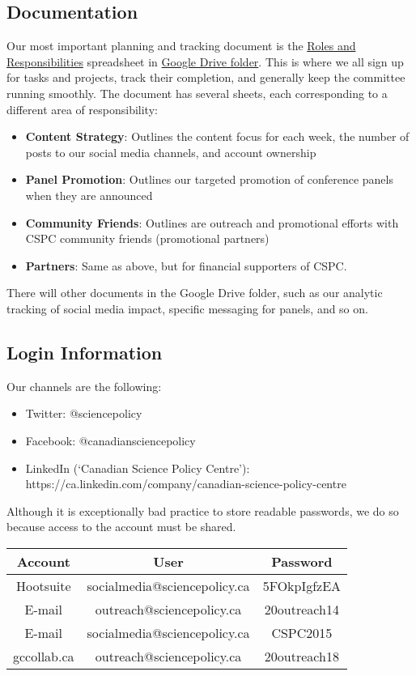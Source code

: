 \documentclass[11pt]{amsart}
\begin{document}
\subsection{Documentation}
Our most important planning and tracking document is the \href{https://docs.google.com/spreadsheets/d/1lpFBDv1iNDUWX_q2PlV3-wX9bY-DUmBBHCQLArtSenY/edit?usp=sharing}{Roles and Responsibilities} spreadsheet in \href{https://drive.google.com/drive/folders/1JjcAsWjjbja4auyTV0g8y4WW9DR7mqMj}{Google Drive folder}.
This is where we all sign up for tasks and projects, track their completion, and generally keep the committee running smoothly.
The document has several sheets, each corresponding to a different area of responsibility:
\begin{itemize}
\item \textbf{Content Strategy}: Outlines the content focus for each week, the number of posts to our social media channels, and account ownership
\item \textbf{Panel Promotion}: Outlines our targeted promotion of conference panels when they are announced
\item \textbf{Community Friends}: Outlines are outreach and promotional efforts with CSPC community friends (promotional partners)
\item \textbf{Partners}: Same as above, but for financial supporters of CSPC.
\end{itemize}
There will other documents in the Google Drive folder, such as our analytic tracking of social media impact, specific messaging for panels, and so on.
\subsection{Login Information}
Our channels are the following:
\begin{itemize}
\item Twitter: @sciencepolicy
\item Facebook: @canadiansciencepolicy
\item LinkedIn (`Canadian Science Policy Centre'): https://ca.linkedin.com/company/canadian-science-policy-centre
\end{itemize}
Although it is exceptionally bad practice to store readable passwords, we do so because access to the account must be shared.
\begin{table}
\centering
\begin{tabular}{|c|c|c|}\hline
Account & User & Password \\\hline
Hootsuite	 & socialmedia@sciencepolicy.ca & 5FOkpIgfzEA \\\hline
E-mail & outreach@sciencepolicy.ca & 20outreach14 \\\hline
E-mail & socialmedia@sciencepolicy.ca	& CSPC2015 \\\hline
gccollab.ca & outreach@sciencepolicy.ca & 20outreach18 \\\hline
\end{tabular}
\end{table}
\end{document}
